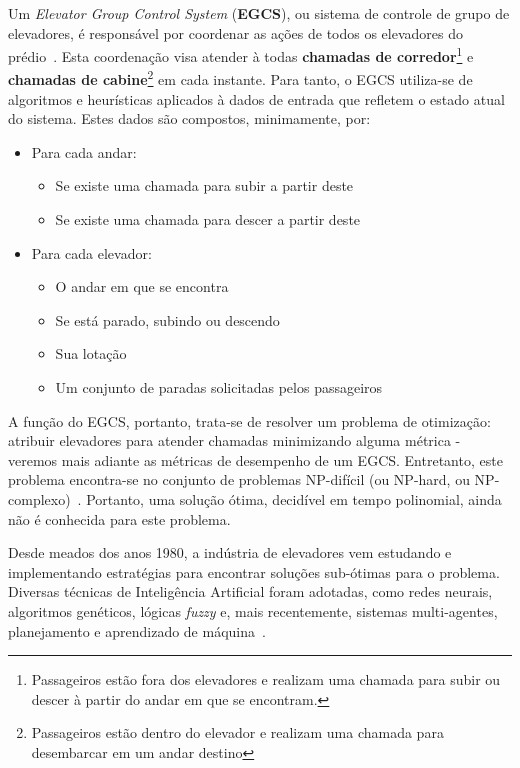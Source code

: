 Um \textit{Elevator Group Control System} (\textbf{EGCS}), ou sistema de controle de grupo de elevadores, é responsável por coordenar as ações de todos os elevadores do prédio~\cite{kuzunuki1984elevator}. Esta coordenação visa atender à todas \textbf{chamadas de corredor}\footnote{Passageiros estão fora dos elevadores e realizam uma chamada para subir ou descer à partir do andar em que se encontram.} e \textbf{chamadas de cabine}\footnote{Passageiros estão dentro do elevador e realizam uma chamada para desembarcar em um andar destino} em cada instante. Para tanto, o EGCS utiliza-se de algoritmos e heurísticas aplicados à dados de entrada que refletem o estado atual do sistema. Estes dados são compostos, minimamente, por:

\begin{itemize}
  \item Para cada andar:
  \begin{itemize}
    \item Se existe uma chamada para subir a partir deste
    \item Se existe uma chamada para descer a partir deste
  \end{itemize}
  \item Para cada elevador:
  \begin{itemize}
    \item O andar em que se encontra
    \item Se está parado, subindo ou descendo
    \item Sua lotação
    \item Um conjunto de paradas solicitadas pelos passageiros
  \end{itemize}
\end{itemize}

A função do EGCS, portanto, trata-se de resolver um problema de otimização: atribuir elevadores para atender chamadas minimizando alguma métrica - veremos mais adiante as métricas de desempenho de um EGCS. Entretanto, este problema encontra-se no conjunto de problemas NP-difícil (ou NP-hard, ou NP-complexo)~\cite{SeKo99}. Portanto, uma solução ótima, decidível em tempo polinomial, ainda não é conhecida para este problema.

Desde meados dos anos 1980, a indústria de elevadores vem estudando e implementando estratégias para encontrar soluções sub-ótimas para o problema. Diversas técnicas de Inteligência Artificial foram adotadas, como redes neurais, algoritmos genéticos, lógicas \textit{fuzzy} e, mais recentemente, sistemas multi-agentes, planejamento e aprendizado de máquina~\cite{KOEHLEROTTIGER02}.


